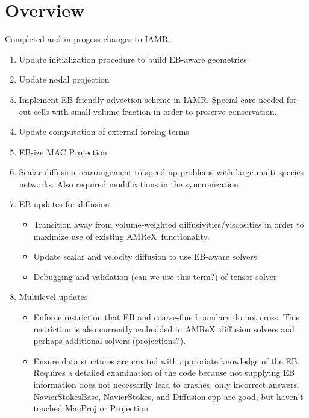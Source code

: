 \documentclass[11pt]{report}
\newcommand{\iamr}{{\sf IAMR}}
\newcommand{\amrex}{{\sf AMReX}}
\begin{document}
\chapter{Overview}

Completed and in-progess changes to \iamr.
\begin{enumerate}
\item
  Update initialization procedure to build EB-aware geometries
\item
  Update nodal projection
\item
  Implement EB-friendly advection scheme in \iamr. Special care needed for cut cells with small volume fraction in order to preserve conservation.
\item
  Update computation of external forcing terms
\item
  EB-ize MAC Projection
\item
  Scalar diffusion rearrangement to speed-up problems with large multi-species networks. Also required modifications in the syncronization
\item
  EB updates for diffusion.
  \begin{itemize}
  \item
    Transition away from volume-weighted diffusivities/viscosities in order to maximize use of existing \amrex\ functionality. 
  \item
    Update scalar and velocity diffusion to use EB-aware solvers
  \item
    Debugging and validation (can we use this term?) of tensor solver
  \end{itemize}
\item
  Multilevel updates
  \begin{itemize}
  \item
    Enforce restriction that EB and coarse-fine boundary do not cross. This restriction is also currently embedded in \amrex\ diffusion solvers and perhaps additional solvers (projections?).
  \item
    Ensure data stuctures are created with approriate knowledge of the EB.
    Requires a detailed examination of the code because not supplying EB information does not necessarily lead to crashes, only incorrect answers.
    NavierStokesBase, NavierStokes, and Diffusion.cpp are good, but haven't touched MacProj or Projection
  \end{itemize}  
\end{enumerate}
\end{document}
